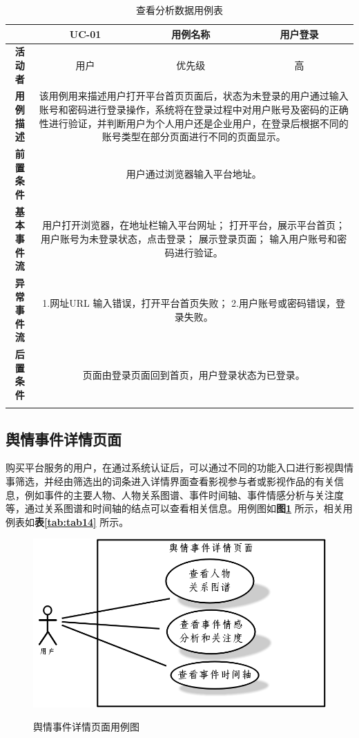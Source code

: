 \begin{longtable}[c]{c|ccc}
	\caption{查看分析数据用例表}
	\label{tab:tab13}\\
	\shline
	\multicolumn{1}{c|}{\textbf{用例编号}} & \multicolumn{1}{c|}{UC-01} & \multicolumn{1}{c|}{用例名称} &  用户登录\\ \hline
	\endhead
	\multicolumn{1}{c|}{\textbf{活动者}} & \multicolumn{1}{c|}{用户} & \multicolumn{1}{c|}{优先级} &高  \\ \hline
	\textbf{用例描述} & \multicolumn{3}{p{12cm}}{该用例用来描述用户打开平台首页页面后，状态为未登录的用户通过输入账号和密码进行登录操作，系统将在登录过程中对用户账号及密码的正确性进行验证，并判断用户为个人用户还是企业用户，在登录后根据不同的账号类型在部分页面进行不同的页面显示。} \\ \hline
	\textbf{前置条件}& \multicolumn{3}{p{12cm}}{用户通过浏览器输入平台地址。} \\ \hline
	\textbf{基本事件流}& \multicolumn{3}{p{12cm}}{用户打开浏览器，在地址栏输入平台网址；\newline
		打开平台，展示平台首页；\newline
		用户账号为未登录状态，点击登录；\newline
		展示登录页面；\newline
		输入用户账号和密码进行验证。} \\ \hline
	\textbf{异常事件流}& \multicolumn{3}{p{12cm}}{1.网址URL 输入错误，打开平台首页失败；\newline
		2.用户账号或密码错误，登录失败。
	} \\ \hline
	\textbf{后置条件}& \multicolumn{3}{p{12cm}}{页面由登录页面回到首页，用户登录状态为已登录。} \\ \shline
\end{longtable}

\subsection{舆情事件详情页面}
购买平台服务的用户，在通过系统认证后，可以通过不同的功能入口进行影视舆情事筛选，并经由筛选出的词条进入详情界面查看影视参与者或影视作品的有关信息，例如事件的主要人物、人物关系图谱、事件时间轴、事件情感分析与关注度等，通过关系图谱和时间轴的结点可以查看相关信息。用例图如\textbf{图\ref{fig:fig5}} 所示，相关用例表如\textbf{表\ref{tab:tab14}} 所示。
\newpage
\begin{figure}[!htb]
	\centering\label{fig:fig5}
	\includegraphics[scale=0.5]{image/f5.png}
	\caption{舆情事件详情页面用例图}
\end{figure}

